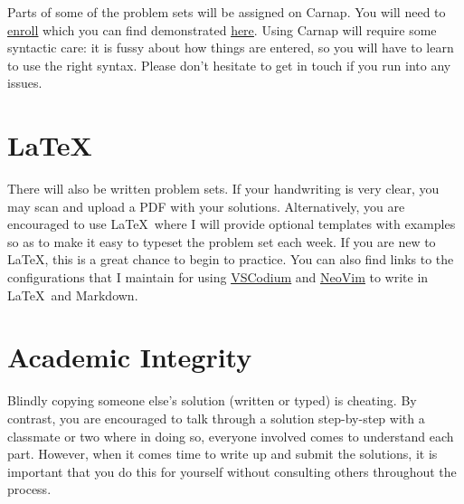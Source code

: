 \documentclass[letterpaper]{inzane_syllabus} %
\begin{document}
Parts of some of the problem sets will be assigned on Carnap.
You will need to \href{https://carnap.io/enroll/Logic%20I%20%282024%29}{\underline{enroll}} which you can find demonstrated \href{https://youtu.be/lmkWcxqxEZk}{\underline{here}}.
Using Carnap will require some syntactic care: it is fussy about how things are entered, so you will have to learn to use the right syntax.
Please don't hesitate to get in touch if you run into any issues.

\vspace{0.5cm}
\section{LaTeX}

There will also be written problem sets.
If your handwriting is very clear, you may scan and upload a PDF with your solutions.
Alternatively, you are encouraged to use \LaTeX\ where I will provide optional templates with examples so as to make it easy to typeset the problem set each week.
If you are new to \LaTeX, this is a great chance to begin to practice.
You can also find links to the configurations that I maintain for using \href{https://github.com/benbrastmckie/VSCodium}{\underline{VSCodium}} and \href{https://github.com/benbrastmckie/.config}{\underline{NeoVim}} to write in \LaTeX\ and Markdown.


\newpage %

\makeSide %


\vspace{0.5cm}
\section{Academic Integrity}

Blindly copying someone else's solution (written or typed) is cheating.
By contrast, you are encouraged to talk through a solution step-by-step with a classmate or two where in doing so, everyone involved comes to understand each part.
However, when it comes time to write up and submit the solutions, it is important that you do this for yourself without consulting others throughout the process.
\end{document}
